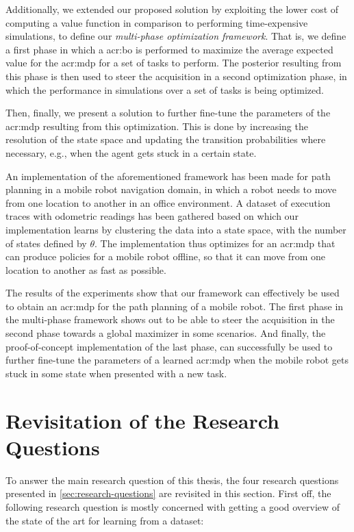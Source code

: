 Additionally, we extended our proposed solution by exploiting the lower cost of computing a value function in comparison to performing time-expensive simulations, to define our \textit{multi-phase optimization framework}.
That is, we define a first phase in which a \acrshort{acr:bo} is performed to maximize the average expected value for the \acrshort{acr:mdp} for a set of tasks to perform.
The posterior resulting from this phase is then used to steer the acquisition in a second optimization phase, in which the performance in simulations over a set of tasks is being optimized.

Then, finally, we present a solution to further fine-tune the parameters of the \acrshort{acr:mdp} resulting from this optimization.
This is done by increasing the resolution of the state space and updating the transition probabilities where necessary, e.g., when the agent gets stuck in a certain state.

An implementation of the aforementioned framework has been made for path planning in a mobile robot navigation domain, in which a robot needs to move from one location to another in an office environment.
A dataset of execution traces with odometric readings has been gathered based on which our implementation learns  by clustering the data into a state space, with the number of states defined by $\theta$.
The implementation thus optimizes for an \acrshort{acr:mdp} that can produce policies for a mobile robot offline, so that it can move from one location to another as fast as possible.

The results of the experiments show that our framework can effectively be used to obtain an \acrshort{acr:mdp} for the path planning of a mobile robot.
The first phase in the multi-phase framework shows out to be able to steer the acquisition in the second phase towards a global maximizer in some scenarios.
And finally, the proof-of-concept implementation of the last phase, can successfully be used to further fine-tune the parameters of a learned \acrshort{acr:mdp} when the mobile robot gets stuck in some state when presented with a new task.


\section{Revisitation of the Research Questions}
\label{sec:revisiting-research-questions}

To answer the main research question of this thesis, the four research questions presented in \autoref{sec:research-questions} are revisited in this section.
First off, the following research question is mostly concerned with getting a good overview of the state of the art for learning  from a dataset:

